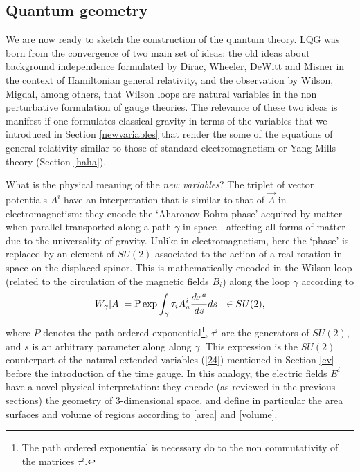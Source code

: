 \documentclass[aps, nofootinbib,superscriptaddress,12pt]{revtex4-2}
\def\be{\begin{equation}}
\def\ee{\end{equation}}
\begin{document}
%
%
\subsection{Quantum geometry}\label{quantum-geometry}

 We are now ready to sketch the construction of the quantum theory. 
 LQG was born from the convergence of two main set of ideas: the old ideas
about background independence formulated by Dirac, Wheeler, DeWitt
and Misner in the context of Hamiltonian general relativity, and
the observation by Wilson, Migdal, among others, that Wilson loops
are natural variables in the non perturbative formulation of gauge
theories. The relevance of these two ideas is manifest if one
formulates classical gravity in terms of the variables that we introduced in Section \ref{newvariables} 
that render the some of the equations of general relativity similar to those of
standard electromagnetism or Yang-Mills theory (Section \ref{haha}).


What is the physical meaning of the {\em new variables}? The triplet
of vector potentials $A^i$ have an interpretation that is similar
to that of $\vec A$ in electromagnetism: they encode the `Aharonov-Bohm phase'
acquired by matter when parallel transported along a path $\gamma$ in
space---affecting all forms of matter due to the universality of
gravity. Unlike in electromagnetism, here the `phase' is replaced by
an element of $SU(2)$ associated to the action of a real rotation in
space on the displaced spinor. This is mathematically encoded in the
Wilson loop (related to the circulation of the magnetic fields $B_i$) along the loop $\gamma$ according to 
\be \label{wilson}
W_{\gamma}[A]={\rm P}
\exp{\int_{\gamma}\tau_i  A^i_a \frac{dx^a}{ds} ds}\ \ \in SU(2),
\ee
where $P$ denotes the path-ordered-exponential\footnote{The path ordered exponential is necessary do to the non commutativity of the
matrices $\tau^i$.}, $\tau^i$ are the
generators of $SU(2)$, and $s$ is an arbitrary parameter along along
$\gamma$.  This expression is the $SU(2)$ counterpart of the natural extended variables 
(\ref{24}) mentioned in Section \ref{ev} before the introduction of the time gauge.  In this analogy, the electric fields $E^i$ have a novel physical
interpretation: they encode (as reviewed in the previous sections) the geometry of
3-dimensional space, and define in particular  the area surfaces and volume of regions
according to \eqref{area} and \eqref{volume}.
\end{document}
